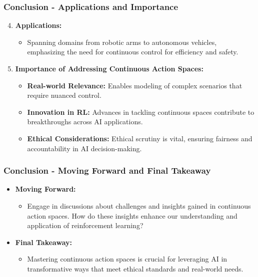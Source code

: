 \documentclass[aspectratio=169]{beamer}
\begin{document}
\begin{frame}[fragile]
    \frametitle{Conclusion - Applications and Importance}
    \begin{enumerate}
        \setcounter{enumi}{3}
        \item \textbf{Applications:}
        \begin{itemize}
            \item Spanning domains from robotic arms to autonomous vehicles, emphasizing the need for continuous control for efficiency and safety.
        \end{itemize}

        \item \textbf{Importance of Addressing Continuous Action Spaces:}
        \begin{itemize}
            \item \textbf{Real-world Relevance:} Enables modeling of complex scenarios that require nuanced control.
            \item \textbf{Innovation in RL:} Advances in tackling continuous spaces contribute to breakthroughs across AI applications.
            \item \textbf{Ethical Considerations:} Ethical scrutiny is vital, ensuring fairness and accountability in AI decision-making.
        \end{itemize}
    \end{enumerate}
\end{frame}

\begin{frame}[fragile]
    \frametitle{Conclusion - Moving Forward and Final Takeaway}
    \begin{itemize}
        \item \textbf{Moving Forward:}
        \begin{itemize}
            \item Engage in discussions about challenges and insights gained in continuous action spaces. How do these insights enhance our understanding and application of reinforcement learning?
        \end{itemize}

        \item \textbf{Final Takeaway:}
        \begin{itemize}
            \item Mastering continuous action spaces is crucial for leveraging AI in transformative ways that meet ethical standards and real-world needs.
        \end{itemize}
    \end{itemize}
\end{frame}
\end{document}
